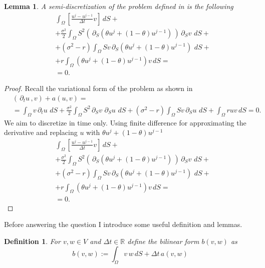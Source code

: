 \documentclass{article}
\newtheorem{df}{Definition}[section]
\newtheorem{lemma}[thm]{Lemma}
\newcommand{\argwrapsquare}[1]{\left[#1\right]}
\newcommand{\intS}[1]{\ensuremath{\int_{\Omega}#1 \, dS}}
\newcommand{\intSlong}[1]{\intS{\argwrapsquare{#1}}}
\newcommand{\darg}[2]{\ensuremath{\, \partial_{#2}#1} \, }
\newcommand{\dt}[1]{\ensuremath{\darg{#1}{t}}}
\newcommand{\dS}[1]{\ensuremath{\darg{#1}{S}}}
\newcommand{\dtu}{\dt{u}}
\newcommand{\dSv}{\dS{v}}
\newcommand{\sigmafrac}{\ensuremath{\frac{\sigma^2}{2}}}
\newcommand{\aform}[2]{\ensuremath{\sigmafrac \intS{S^2 \dS{#2} \dS{#1}} + (\sigma^2 - r) \intS{S #2 \dS{#1}} + \intS{r  #1  #2}}}
\newcommand{\auv}{\aform{u}{v}}
\begin{document}
\begin{lemma}\label{lemma:semi_discrete_prob}
    A semi-discretization of the problem defined in  is the following
     \begin{align*}
        &\intSlong{\frac{u^{j} - u^{j-1}}{\Delta t}  v} + \\
        &+\sigmafrac \intS{S^2 \left(\dS{\left(\theta u^{j} + (1- \theta) u^{j-1} \right)}\right) \dSv} + \\
        &+ (\sigma^2 - r) \intS{S v \dS{\left(\theta u^{j} + (1- \theta) u^{j-1} \right)}} + \\
        &+r \intS{\left(\theta u^{j} + (1- \theta) u^{j-1} \right)v} =\\
        &=0.
        \end{align*}
\end{lemma}
\begin{proof}
    Recall the variational form of the problem as shown in 
    \begin{align*}
        &\left( \dtu, v\right) + a(u,v) = \\
        &= \intS{v \dtu} + \auv = 0.
    \end{align*}
    We aim to discretize in time only. Using finite difference for approximating the derivative and replacing $u$ with $\theta u^{j} + (1- \theta) u^{j-1}$
     \begin{align*}
        &\intSlong{\frac{u^{j} - u^{j-1}}{\Delta t}  v} + \\
        &+\sigmafrac \intS{S^2 \left(\dS{\left(\theta u^{j} + (1- \theta) u^{j-1} \right)}\right) \dSv} + \\
        &+ (\sigma^2 - r) \intS{S v \dS{\left(\theta u^{j} + (1- \theta) u^{j-1} \right)}} + \\
        &+r \intS{\left(\theta u^{j} + (1- \theta) u^{j-1} \right)v} =\\
        &=0.
        \end{align*}
\end{proof}
Before answering the question I introduce some useful definition and lemmas.


\begin{df}\label{def:b}
    For $v,w \in V$ and $\Delta t \in \mathbb{R}$ define the bilinear form $b(v, w)$ as
    \begin{equation*}
        b(v, w) := \intS{v\,w} + \Delta t\,a(v,w)
    \end{equation*}
\end{df}
\end{document}
